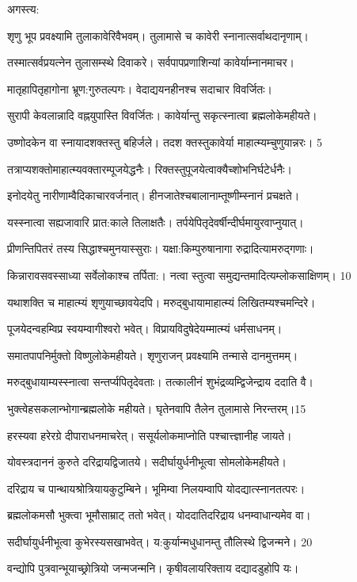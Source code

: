 अगस्त्य:

शृणु भूप प्रवक्ष्यामि तुलाकावेरिवैभवम्।
तुलामासे च कावेरी स्नानात्सर्वाथदानृणाम्।

तस्मात्सर्वप्रयत्नेन तुलासम्स्थे दिवाकरे।
सर्वपापप्रणाशिन्यां कावेर्याम्नानमाचर।

मातृहापितृहागोना भ्रूण:गुरुतल्पगः।
वेदाद्ययनहीनश्च सदाचार विवर्जितः।

सुरापी केवलान्नादि वह्नयुपास्ति विवर्जितः।
कावेर्यान्तु सकृत्स्नात्वा ब्रह्मलोकेमहीयते।

उष्णोदकेन वा स्नायादशक्तस्तु बहिर्जले।
तदश क्तस्तुकावेर्या माहात्म्यम्चुणुयान्नरः। 5

तत्राप्यशक्तोमाहात्म्यवक्तारम्पूजयेद्धनैः।
रिक्तस्तुपूजयेत्वाक्यैच्शोभनिर्घटेर्धनैः।

इनोदयेतु नारीणाम्वैदिकाचारवर्जनात्।
हीनजातेश्चबालानाम्तूष्णीम्स्नानं प्रचक्षते।

यस्स्नात्वा सह्यजावारि प्रात:काले तिलाक्षतैः।
तर्पयेपितृदेवर्षीन्दीर्घमायुरवाप्नुयात्।

प्रीणन्तिपितरं तस्य सिद्धाश्चमुनयास्सुराः।
यक्षा:किम्पुरुषानागा रुद्रादित्यामरुद्गणाः।

किन्नारावसवस्साध्या सर्वेलोकाश्च तर्पिता:।
नत्वा स्तुत्वा समुद्यन्तमादित्यम्लोकसाक्षिणम्। 10

यथाशक्ति च माहात्म्यं शृणुयाच्छावयेदपि।
मरुद्बुधायामाहात्म्यं लिखितम्यश्चमन्दिरे।

पूजयेदन्वहम्विप्र स्वयम्वागीश्वरो भवेत्।
विप्रायविदुषेदेयम्मात्म्यं धर्मसाधनम्।

समातपापनिर्मुक्तो विष्णुलोकेमहीयते।
शृणुराजन् प्रवक्ष्यामि तन्मासे दानमुत्तमम्।

मरुद्बुधायाम्यस्स्नात्वा सन्तर्प्यपितृदेवताः।
तत्कालीनं शुभंद्रव्यम्द्विजेन्द्राय ददाति वै।

भुक्त्वेहसकलान्भोगान्ब्रह्मलोके महीयते।
घृतेनवापि तैलेन तुलामासे निरन्तरम्।15

हरस्यवा हरेरग्रे दीपाराधनमाचरेत्।
ससूर्यलोकमाप्नोति पश्चात्त्ज्ञानीह जायते।

योवस्त्रदाननं कुरुते दरिद्रायद्विजातये।
सदीर्घायुर्धनीभूत्वा सोमलोकेमहीयते।

दरिद्राय च पान्थायश्रोत्रियायकुटुम्बिने।
भूमिम्वा निलयम्वापि योदद्यात्स्नानतत्परः।

ब्रह्मलोकमसौ भुक्त्वा भूमौसाम्राट् ततो भवेत्।
योददातिदरिद्राय धनम्वाधान्यमेव वा।

सदीर्घायुर्धनीभूत्वा कुभेरस्यसखाभवेत्।
य:कुर्यान्मधुधानम्तु तौलिस्थे द्विजन्मने। 20

वन्द्योपि पुत्रवान्भूयाच्छ्रोत्रियो जन्मजन्मनि।
कृषीवलायरिक्ताय दद्यादडुहोपि यः।

